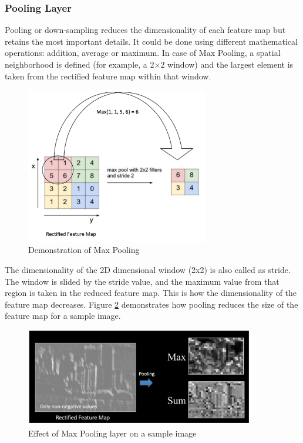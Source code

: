 \subsubsection*{Pooling Layer}
\label{sect5_1_2_1a_b}
Pooling or down-sampling reduces the dimensionality of each feature map but retains the most important details. It could be done using different mathematical operations: addition, average or maximum.\newline\newline
In case of Max Pooling, a spatial neighborhood is defined (for example, a 2×2 window) and the largest element is taken from the rectified feature map within that window.
\begin{figure}[h!]
\centering
\includegraphics[width=8cm]{figures/Max_Pooling.png}
\caption{Demonstration of Max Pooling}
\label{fig:cnn8}
\end{figure}
The dimensionality of the 2D dimensional window (2x2) is also called as stride. The window is slided by the stride value, and the maximum value from that region is taken in the reduced feature map. This is how the dimensionality of the feature map decreases. Figure \ref{fig:cnn9} demonstrates how pooling reduces the size of the feature map for a sample image.
\begin{figure}[h!]
\centering
\includegraphics[width=10cm]{figures/Effect_Pooling.png}
\caption{Effect of Max Pooling layer on a sample image}
\label{fig:cnn9}
\end{figure}

